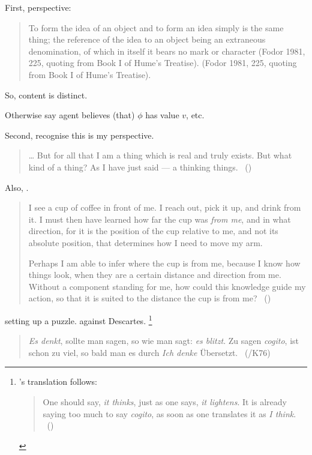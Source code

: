 \begin{note}
  First, perspective:

  \begin{quote}
    To form the idea of an object and to form an idea simply is the same thing; the reference of the idea to an object being an extraneous denomination, of which in itself it bears no mark or character (Fodor 1981, 225, quoting from Book I of Hume’s Treatise).
    (Fodor 1981, 225, quoting from Book I of Hume’s Treatise).
  \end{quote}

  So, content is distinct.

  Otherwise say agent believes (that) \(\phi\) has value \(v\), etc.
\end{note}

\begin{note}
  Second, recognise this is my perspective.

  \cite{Descartes:1996vp}

  \begin{quote}
    \dots
    But for all that I am a thing which is real and truly exists.
    But what kind of a thing?
    As I have just said --- a thinking things.%
    \mbox{ }\hfill\mbox{(\citeyear[18]{Descartes:1996vp})}
  \end{quote}

  

  Also, \citeauthor{Perry:1986aa}.

  \begin{quote}
    I see a cup of coffee in front of me. I reach out, pick it up, and drink from it. I must then have learned how far the cup was \emph{from me}, and in what direction, for it is the position of the cup relative to me, and not its absolute position, that determines how I need to move my arm.

    Perhaps I am able to infer where the cup is from me, because I know how things look, when they are a certain distance and direction from me. Without a component standing for me, how could this knowledge guide my action, so that it is suited to the distance the cup is from me?%
    \mbox{ }\hfill\mbox{(\citeyear[205]{Perry:1986aa})}
  \end{quote}

  \citeauthor{Perry:1986aa} setting up a puzzle.
  \citeauthor{Lichtenberg:1991tf} against Descartes.%
  \footnote{
    \citeauthor{Zoller:1992ud}'s translation follows:
    \begin{quote}
      One should say, \emph{it thinks}, just as one says, \emph{it lightens}.
      It is already saying too much to say \emph{cogito}, as soon as one translates it as \emph{I think}.
      \mbox{ }\hfill\mbox{(\citeyear[418]{Zoller:1992ud})}
    \end{quote}
  }
  \begin{quote}
    \emph{Es denkt}, sollte man sagen, so wie man sagt: \emph{es blitzt}.
    Zu sagen \emph{cogito}, ist schon zu viel, so bald man es durch \emph{Ich denke} \"{U}bersetzt.
    \mbox{ }\hfill\mbox{(\citeyear[412]{Lichtenberg:1991tf}/K76)}
  \end{quote}
\end{note}

